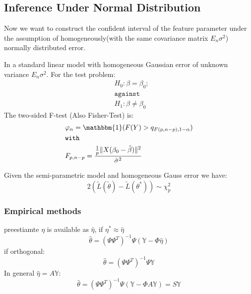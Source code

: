 \subsection{Inference Under Normal Distribution}
Now we want to construct the confident interval of the feature parameter under the assumption of homogeneously(with the same covariance matrix $E_n \sigma^2$) normally distributed error.

\begin{theorem}[F-test]
In a standard linear model with homogeneous Gaussian error of unknown variance $E_n \sigma^2$. For the test problem:
\begin{align*}
    & H_0: \beta = \beta_0;\\
    & \texttt{against}\\
    & H_1: \beta \neq \beta_0
\end{align*}
The two-sided F-test (Also Fisher-Test) is: 
\begin{align*}
    &\varphi_\alpha = \mathbbm{1}(F(Y) > q_{F(p, n - p), 1-\alpha})\\
    &\texttt{with}\\
    & F_{p, n - p} = \frac{\frac{1}{p} \|X( \beta_0 - \hat{\beta} )\|^2}{\hat{\sigma}^2}
\end{align*}
\end{theorem}

\begin{theorem}[t-test]
\end{theorem}

\begin{theorem}
	Given the semi-parametric model  and homogeneous Gauss error we have:
	\begin{equation*}
		2(\tilde{L}(\tilde{\theta}) - \tilde{L}(\theta^*)) \sim \chi^2_p
	\end{equation*}
\end{theorem}


\subsubsection*{Empirical methods}
preestiamte $\eta$ is available as $\hat{\eta}$, if $\eta^* \approx \hat{\eta}$
\begin{equation*}
	\hat{\theta} = (\Psi \Psi^T)^{-1} \Psi(\mathbb{Y} - \Phi \hat{\eta})
\end{equation*}
if orthogonal:
\begin{equation*}
	\hat{\theta} = (\Psi \Psi^T)^{-1} \Psi\mathbb{Y}
\end{equation*}
In general $\hat{\eta} = A\mathbb{Y}$:
\begin{equation*}
	\hat{\theta} = (\Psi\Psi^T)^{-1} \Psi(\mathbb{Y} - \Phi A \mathbb{Y}) = S\mathbb{Y}
\end{equation*}

